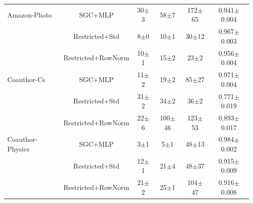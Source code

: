 \begin{table}[t]
\begin{tabular}{lccccc}
\midrule
Amazon-Photo         & SGC+MLP                   & 30$\pm$3 & 58$\pm$7 & 172$\pm$65 & 0.941$\pm$0.004 \\
                     & Restricted+Std            & 8$\pm$0 & 10$\pm$1 & 30$\pm$12 & 0.967$\pm$0.003 \\
                     & Restricted+RowNorm        & 10$\pm$1 & 15$\pm$2 & 23$\pm$2 & 0.956$\pm$0.004 \\
\midrule
Coauthor-Cs          & SGC+MLP                   & 11$\pm$2 & 19$\pm$2 & 85$\pm$27 & 0.971$\pm$0.004 \\
                     & Restricted+Std            & 31$\pm$2 & 34$\pm$2 & 36$\pm$2 & 0.771$\pm$0.019 \\
                     & Restricted+RowNorm        & 22$\pm$6 & 100$\pm$46 & 123$\pm$53 & 0.893$\pm$0.017 \\
\midrule
Coauthor-Physics     & SGC+MLP                   & 3$\pm$1 & 5$\pm$1 & 48$\pm$13 & 0.984$\pm$0.002 \\
                     & Restricted+Std            & 12$\pm$1 & 21$\pm$4 & 48$\pm$37 & 0.915$\pm$0.009 \\
                     & Restricted+RowNorm        & 21$\pm$2 & 25$\pm$1 & 104$\pm$47 & 0.916$\pm$0.008 \\
\bottomrule
\end{tabular}
\end{table}
